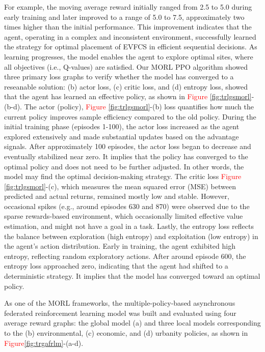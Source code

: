 \documentclass[preprint,12pt]{elsarticle}
\begin{document}
For example, the moving average reward initially ranged from 2.5 to 5.0 during early training and later improved to a range of 5.0 to 7.5, approximately two times higher than the initial performance. This improvement indicates that the agent, operating in a complex and inconsistent environment, successfully learned the strategy for optimal placement of EVFCS in efficient sequential decisions. As learning progresses, the model enables the agent to explore optimal sites, where all objectives (i.e., Q-values) are satisfied. Our MORL PPO algorithm showed three primary loss graphs to verify whether the model has converged to a reseanable solution: (b) actor loss, (c) critic loss, and (d) entropy loss, showed that the agent has learned an effective policy, as shown in \textcolor{red}{Figure} \ref{fig:trlgsmorl}-(b-d). The actor (policy), \textcolor{red}{Figure} \ref{fig:trlgsmorl}-(b) loss quantifies how much the current policy improves sample efficiency compared to the old policy. During the initial training phase (episodes 1-100), the actor loss increased as the agent explored extensively and made substantial updates based on the advantage signals. After approximately 100 episodes, the actor loss began to decrease and eventually stabilized near zero. It implies that the policy has converged to the optimal policy and does not need to be further adjusted. In other words, the model may find the optimal decision-making strategy. The critic loss \textcolor{red}{Figure} \ref{fig:trlgsmorl}-(c), which measures the mean squared error (MSE) between predicted and actual returns, remained mostly low and stable. However, occasional spikes (e.g., around episodes 630 and 870) were observed due to the sparse rewards-based environment, which occasionally limited effective value estimation, and might not have a goal in a task. Lastly, the entropy loss reflects the balance between exploration (high entropy) and exploitation (low entropy) in the agent's action distribution. Early in training, the agent exhibited high entropy, reflecting random exploratory actions. After around episode 600, the entropy loss approached zero, indicating that the agent had shifted to a deterministic strategy. It implies that the model has converged toward an optimal policy.  

\vspace{0.5cm}

As one of the MORL frameworks, the multiple-policy-based asynchronous federated reinforcement learning model was built and evaluated using four average reward graphs: the global model (a) and three local models corresponding to the (b) environmental, (c) economic, and (d) urbanity policies, as shown in \textcolor{red}{Figure}\ref{fig:trgafrlm}-(a-d). 
\end{document}
